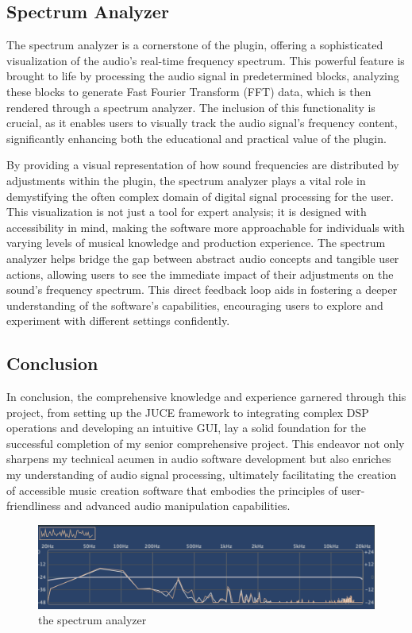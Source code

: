 \documentclass[10pt,twocolumn]{article}
\begin{document}
\subsection{Spectrum Analyzer}
The spectrum analyzer is a cornerstone of the plugin, offering a sophisticated visualization of the audio's real-time frequency spectrum. This powerful feature is brought to life by processing the audio signal in predetermined blocks, analyzing these blocks to generate Fast Fourier Transform (FFT) data, which is then  rendered through a spectrum analyzer. The inclusion of this functionality is crucial, as it enables users to visually track the audio signal's frequency content, significantly enhancing both the educational and practical value of the plugin.

By providing a visual representation of how sound frequencies are distributed by adjustments within the plugin, the spectrum analyzer plays a vital role in demystifying the often complex domain of digital signal processing for the user. This visualization is not just a tool for expert analysis; it is designed with accessibility in mind, making the software more approachable for individuals with varying levels of musical knowledge and production experience. The spectrum analyzer helps bridge the gap between abstract audio concepts and tangible user actions, allowing users to see the immediate impact of their adjustments on the sound's frequency spectrum. This direct feedback loop aids in fostering a deeper understanding of the software's capabilities, encouraging users to explore and experiment with different settings confidently.


\subsection{Conclusion}
In conclusion, the comprehensive knowledge and experience garnered through this project, from setting up the JUCE framework to integrating complex DSP operations and developing an intuitive GUI, lay a solid foundation for the successful completion of my senior comprehensive project. This endeavor not only sharpens my technical acumen in audio software development but also enriches my understanding of audio signal processing, ultimately facilitating the creation of accessible music creation software that embodies the principles of user-friendliness and advanced audio manipulation capabilities.


\begin{figure}
    \centering
    \includegraphics[width=.95\linewidth]{spectrum analyzer.png}
    \caption{
        the spectrum analyzer
    }
    \label{fig:first-page}
\end{figure}
\end{document}
